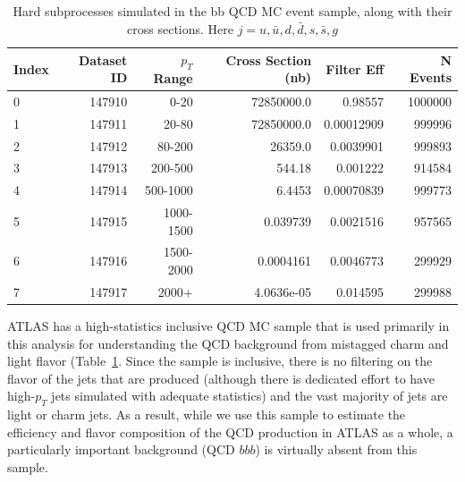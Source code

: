 \begin{table}[h]
 \begin{center}
\caption{Hard subprocesses simulated in the bb QCD MC event sample, along with their cross sections. Here
$j=u,\bar{u},d,\bar{d},s,\bar{s},g$
\label{tab:qcd_mc_parameters}}
    \begin{tabular}{l r r r r r} \hline \hline
    Index & Dataset ID & $p_T$ Range& Cross Section (nb)& Filter Eff   & N Events \\ \hline
    0     &  147910    & 0-20        &  72850000.0       &      0.98557 & 1000000 \\
    1     &  147911    & 20-80       &  72850000.0       &   0.00012909 & 999996  \\
    2     &  147912    & 80-200      &     26359.0       &    0.0039901 & 999893 \\
    3     &  147913    & 200-500     &      544.18       &     0.001222 & 914584 \\
    4     &  147914    & 500-1000    &      6.4453       &   0.00070839 & 999773 \\
    5     &  147915    & 1000-1500   &    0.039739       &    0.0021516 & 957565 \\
    6     &  147916    & 1500-2000   &   0.0004161       &    0.0046773 & 299929 \\
    7     &  147917    & 2000+       &  4.0636e-05       &     0.014595 & 299988 \\ \hline
    \end{tabular}
  \end{center}
\end{table}

ATLAS has a high-statistics inclusive QCD MC sample that is used primarily in 
this analysis for understanding the QCD background from 
mistagged charm and light flavor (Table~\ref{tab:qcd_mc_parameters}.  Since 
the sample is inclusive, there is no filtering on the flavor of the jets 
that are produced (although there is dedicated effort to have high-$p_T$ 
jets simulated with adequate statistics) and the vast majority of jets are light or 
charm jets.  As a result, while we use this sample to estimate the 
efficiency and flavor composition of the QCD production in ATLAS as a whole, a 
particularly important background (QCD $bbb$) is virtually absent from this sample.


